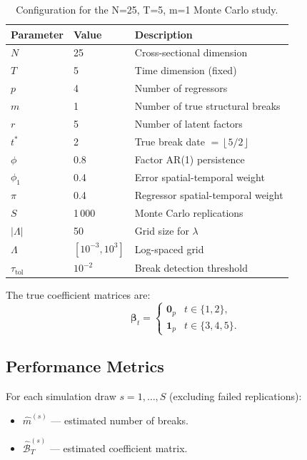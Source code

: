 \documentclass[12pt, a4paper]{article}
\theoremstyle{plain}
\theoremstyle{definition}
\theoremstyle{remark}
\newcommand{\bB}{\mathcal{B}}
\newcommand{\bbeta}{\bm{\beta}}
\newcommand{\floor}[1]{\left\lfloor #1 \right\rfloor}
\begin{document}
\begin{onehalfspacing}
\begin{table}[htb]
  \centering
  \caption{Configuration for the N=25, T=5, m=1 Monte Carlo study.}
  \label{tab:config}
  \begin{tabular}{lll}
    \toprule
    Parameter & Value & Description \\
    \midrule
    $N$              & 25      & Cross-sectional dimension \\
    $T$              & 5       & Time dimension (fixed) \\
    $p$              & 4       & Number of regressors \\
    $m$              & 1       & Number of true structural breaks \\
    $r$              & 5       & Number of latent factors \\
    $t^*$            & 2       & True break date $= \floor{5/2}$ \\
    $\phi$           & 0.8     & Factor AR(1) persistence \\
    $\phi_1$         & 0.4     & Error spatial-temporal weight \\
    $\pi$            & 0.4     & Regressor spatial-temporal weight \\
    $S$              & 1\,000  & Monte Carlo replications \\
    $|\Lambda|$      & 50      & Grid size for $\lambda$ \\
    $\Lambda$        & $[10^{-3}, 10^{3}]$ & Log-spaced grid \\
    $\tau_\text{tol}$& $10^{-2}$ & Break detection threshold \\
    \bottomrule
  \end{tabular}
\end{table}

The true coefficient matrices are:
\begin{equation}
  \bbeta_t =
  \begin{cases}
    \mathbf{0}_p & t \in \{1, 2\}, \\
    \mathbf{1}_p & t \in \{3, 4, 5\}.
  \end{cases}
\end{equation}

\subsection{Performance Metrics}

For each simulation draw $s = 1,\ldots,S$ (excluding failed replications):
\begin{itemize}[noitemsep]
  \item $\hat{m}^{(s)}$ — estimated number of breaks.
  \item $\hat{\bB}_T^{(s)}$ — estimated coefficient matrix.
\end{itemize}


\end{onehalfspacing}
\end{document}
